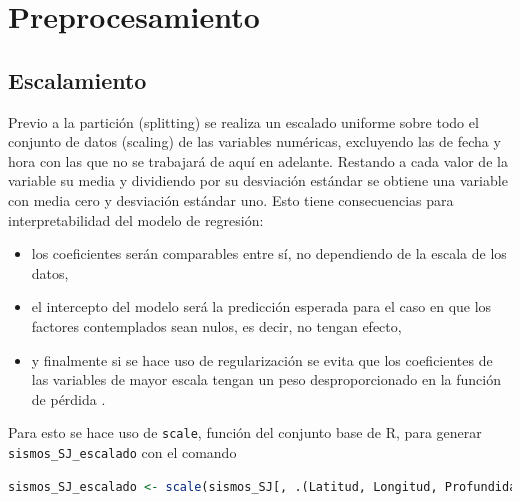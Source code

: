 \documentclass[a4paper]{report}
\begin{document}





\section{Preprocesamiento}


\subsection{Escalamiento}\label{sec:escalamiento}
Previo a la partición (splitting) se realiza un escalado uniforme sobre todo el conjunto de datos (scaling) de las variables numéricas, excluyendo las de fecha y hora con las que no se trabajará de aquí en adelante.
Restando a cada valor de la variable su media y dividiendo por su desviación estándar se obtiene una variable con media cero y desviación estándar uno. 
Esto tiene consecuencias para interpretabilidad del modelo de regresión:
\begin{itemize}
	\item los coeficientes serán comparables entre sí, no dependiendo de la escala de los datos,
	\item el intercepto del modelo será la predicción esperada para el caso en que los factores contemplados sean nulos, es decir, no tengan efecto,
	\item y finalmente si se hace uso de regularización se evita que los coeficientes de las variables de mayor escala tengan un peso desproporcionado en la función de pérdida \cite[sección 3.4.1]{hastie_elements_2009}.
\end{itemize}
Para esto se hace uso de \lstinline[language = R]'scale', función del conjunto base de R, para generar \lstinline[language = R]'sismos_SJ_escalado' con el comando
\begin{lstlisting}[breaklines=true, language=R]
sismos_SJ_escalado <- scale(sismos_SJ[, .(Latitud, Longitud, Profundidad, Magnitud, `Proxy amplitud`, `Proxy energía`)])
\end{lstlisting} 
\end{document}
